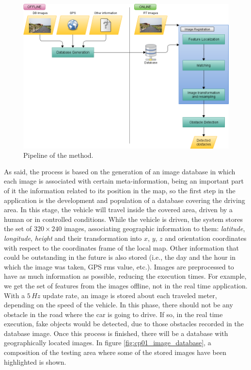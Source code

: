 \begin{figure}[thb]
  \centering
  \includegraphics{pipeline}
  \caption{Pipeline of the method.}
  \label{fig:cp01_pipeline}
\end{figure}

As said, the process is based on the generation of an image database in which each image is associated with certain meta-information, being an important part of it the information related to its position in the map, so the first step in the application is the development and population of a database covering the driving area. In this stage, the vehicle will travel inside the covered area, driven by a human or in controlled conditions. While the vehicle is driven, the system stores the set of $320 \times 240$ images, associating geographic information to them: \emph{latitude}, \emph{longitude}, \emph{height} and their transformation into $x$, $y$, $z$ and orientation coordinates with respect to the coordinates frame of the local map. Other information that could be outstanding in the future is also stored (i.e., the day and the hour in which the image was taken, \acs{GPS} rms value, etc.). Images are preprocessed to have as much information as possible, reducing the execution times. For example, we get the set of features from the images offline, not in the real time application. With a $5\,Hz$ update rate, an image is stored about each traveled meter, depending on the speed of the vehicle. In this phase, there should not be any obstacle in the road where the car is going to drive. If so, in the real time execution, fake objects would be detected, due to those obstacles recorded in the database image. Once this process is finished, there will be a database with geographically located images. In figure \ref{fig:cp01_image_database}, a composition of the testing area where some of the stored images have been highlighted is shown.

